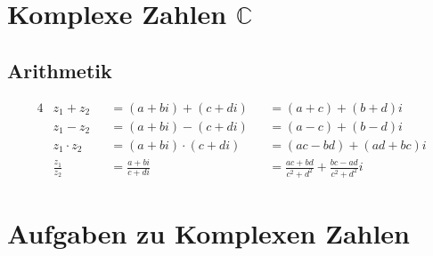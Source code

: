 \documentclass{article}
\begin{document}
    \large  

    \section{Komplexe Zahlen $\mathbb{C}$}

    \subsection{Arithmetik}

    \begin{alignat*}{4}
        &z_1 + z_2       &&= (a + bi) + (c + di)     &&= (a + c) + (b + d)i \\
        &z_1 - z_2       &&= (a + bi) - (c + di)     &&= (a - c) + (b - d)i \\
        &z_1 \cdot z_2   &&= (a + bi) \cdot (c + di) &&= (ac - bd) + (ad + bc)i \\
        &\frac{z_1}{z_2} &&= \frac{a + bi}{c + di}   &&= \frac{ac + bd}{c^2 + d^2} + \frac{bc - ad}{c^2 + d^2}i
    \end{alignat*}

    \section{Aufgaben zu Komplexen Zahlen}
\end{document}
